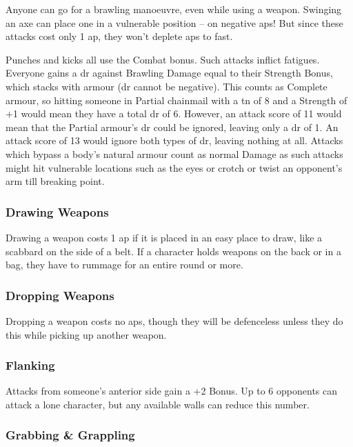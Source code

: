 \begin{multicols}{2}
Anyone can go for a brawling manoeuvre, even while using a weapon.
Swinging an axe can place one in a vulnerable position -- on negative \glspl{ap}!
But since these attacks cost only 1 \gls{ap}, they won't deplete \glspl{ap} to fast.

Punches and kicks all use the Combat bonus.
Such attacks inflict \glspl{fatigue}.
Everyone gains a \gls{dr} against Brawling Damage equal to their Strength Bonus, which stacks with armour (\gls{dr} cannot be negative).
This counts as Complete armour, so hitting someone in Partial chainmail with a \gls{tn} of 8 and a Strength of +1 would mean they have a total \gls{dr} of 6.
However, an attack score of 11 would mean that the Partial armour's \gls{dr} could be ignored, leaving only a \gls{dr} of 1.
An attack score of 13 would ignore both types of \gls{dr}, leaving nothing at all.
Attacks which bypass a body's natural armour count as normal Damage as such attacks might hit vulnerable locations such as the eyes or crotch or twist an opponent's arm till breaking point.

\subsubsection[Drawing Weapon -- Cost: 1 \glsentrytext{ap}]{Drawing Weapons}

Drawing a weapon costs 1 \gls{ap} if it is placed in an easy place to draw, like a scabbard on the side of a belt.
If a character holds weapons on the back or in a bag, they have to rummage for an entire round or more.

\subsubsection[Dropping Weapon -- Cost: 0 \gls{ap}]{Dropping Weapons}

Dropping a weapon costs no \glspl{ap}, though they will be defenceless unless they do this while picking up another weapon.


\subsubsection[Flanking: Gain +2 to attack]{Flanking}\label{flank}

Attacks from someone's anterior side gain a +2 Bonus.
Up to 6 opponents can attack a lone character, but any available walls can reduce this number.

\subsubsection{Grabbing \& Grappling}
\label{grappling}


\end{multicols}
